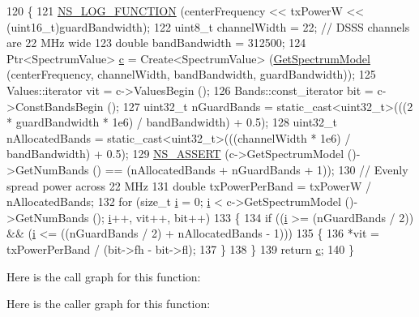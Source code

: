 \begin{DoxyCode}
120 \{
121   \hyperlink{log-macros-disabled_8h_a90b90d5bad1f39cb1b64923ea94c0761}{NS\_LOG\_FUNCTION} (centerFrequency << txPowerW << (uint16\_t)guardBandwidth);
122   uint8\_t channelWidth = 22;  \textcolor{comment}{// DSSS channels are 22 MHz wide}
123   \textcolor{keywordtype}{double} bandBandwidth = 312500;
124   Ptr<SpectrumValue> \hyperlink{lte_2model_2fading-traces_2fading__trace__generator_8m_ae0323a9039add2978bf5b49550572c7c}{c} = Create<SpectrumValue> (\hyperlink{classns3_1_1WifiSpectrumValueHelper_a09b58fb2741ff1a78ae6d952ad08b1bb}{GetSpectrumModel} (centerFrequency, 
      channelWidth, bandBandwidth, guardBandwidth));
125   Values::iterator vit = c->ValuesBegin ();
126   Bands::const\_iterator bit = c->ConstBandsBegin ();
127   uint32\_t nGuardBands = \textcolor{keyword}{static\_cast<}uint32\_t\textcolor{keyword}{>}(((2 * guardBandwidth * 1e6) / bandBandwidth) + 0.5);
128   uint32\_t nAllocatedBands = \textcolor{keyword}{static\_cast<}uint32\_t\textcolor{keyword}{>}(((channelWidth * 1e6) / bandBandwidth) + 0.5);
129   \hyperlink{assert_8h_a6dccdb0de9b252f60088ce281c49d052}{NS\_ASSERT} (c->GetSpectrumModel ()->GetNumBands () == (nAllocatedBands + nGuardBands + 1));
130   \textcolor{comment}{// Evenly spread power across 22 MHz}
131   \textcolor{keywordtype}{double} txPowerPerBand = txPowerW / nAllocatedBands;
132   \textcolor{keywordflow}{for} (\textcolor{keywordtype}{size\_t} \hyperlink{bernuolliDistribution_8m_a6f6ccfcf58b31cb6412107d9d5281426}{i} = 0; \hyperlink{bernuolliDistribution_8m_a6f6ccfcf58b31cb6412107d9d5281426}{i} < c->GetSpectrumModel ()->GetNumBands (); \hyperlink{bernuolliDistribution_8m_a6f6ccfcf58b31cb6412107d9d5281426}{i}++, vit++, bit++)
133     \{
134       \textcolor{keywordflow}{if} ((\hyperlink{bernuolliDistribution_8m_a6f6ccfcf58b31cb6412107d9d5281426}{i} >= (nGuardBands / 2)) && (\hyperlink{bernuolliDistribution_8m_a6f6ccfcf58b31cb6412107d9d5281426}{i} <= ((nGuardBands / 2) + nAllocatedBands - 1)))
135         \{
136           *vit = txPowerPerBand / (bit->fh - bit->fl);
137         \}
138     \}
139   \textcolor{keywordflow}{return} \hyperlink{lte_2model_2fading-traces_2fading__trace__generator_8m_ae0323a9039add2978bf5b49550572c7c}{c};
140 \}
\end{DoxyCode}


Here is the call graph for this function\+:




Here is the caller graph for this function\+:


